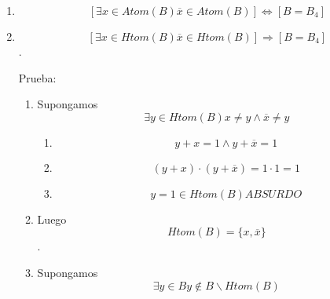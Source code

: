 \documentclass[
]{article}
\providecommand{\tightlist}{%
  \setlength{\itemsep}{0pt}\setlength{\parskip}{0pt}}
\begin{document}
\begin{enumerate}
\begin{enumerate}
\begin{enumerate}
\begin{enumerate}
        \[\land \left\lbrack {{{\left\lbrack {x\mathsf{\mathit{minimal}}y} \right\rbrack \land \left\lbrack {\overline{x}\mathsf{\mathit{minimal}}\overline{y}} \right\rbrack} \land \left\lbrack {\neg{({x\mathsf{\mathit{minimal}}\overline{y}})}} \right\rbrack} \land \left\lbrack {\neg{({\overline{x}\mathsf{\mathit{minimal}}y})}} \right\rbrack} \right\rbrack\]
      \item
        \[\forall{{\{{y,\overline{y}}\}} \subset B_{\ast}^{\ast}}{{{y \cdot \overline{x}} = {{0 \land y} + \overline{x}}} = 1}\]
      \item
        \[\forall{{\{{y,\overline{y}}\}} \subset B_{\ast}^{\ast}}{{y = {x \land \overline{y}}} = \overline{x}}\]
      \item
        \[{B_{\ast}^{\ast} = {{\{ 1,0\}} \cup \mathit{Atom}}}{{{(B)} = {\{{1,0,x,\overline{x}}\}}} = B_{4}}\]
      \end{enumerate}
    \item
      \[\left\lbrack {\exists{x \in \mathit{Atom}}{(B)}{\overline{x} \in \mathit{Atom}}{(B)}} \right\rbrack\Leftrightarrow\left\lbrack {B = B_{4}} \right\rbrack\]
    \item
      \[\left\lbrack {\exists{x \in \mathit{Htom}}{(B)}{\overline{x} \in \mathit{Htom}}{(B)}} \right\rbrack\Rightarrow\left\lbrack {B = B_{4}} \right\rbrack\].

      Prueba:

      \begin{enumerate}
      \def\labelenumiv{\arabic{enumiv}.}
      \item
        Supongamos
        \[\exists{y \in \mathit{Htom}}{(B)}{{x \neq {y \land \overline{x}}} \neq y}\]

        \begin{enumerate}
        \def\labelenumv{\arabic{enumv}.}
        \tightlist
        \item
          \[{{y + x} = {{1 \land y} + \overline{x}}} = 1\]
        \item
          \[{{{({y + x})} \cdot {({y + \overline{x}})}} = {1 \cdot 1}} = 1\]
        \item
          \[{{y = 1} \in \mathit{Htom}}{(B)}\mathit{ABSURDO}\]
        \end{enumerate}
      \item
        Luego \[\mathit{Htom}{{(B)} = {\{{x,\overline{x}}\}}}\].
      \item
        Supongamos
        \[\exists{y \in B}{y \notin {B \smallsetminus {\mathit{Htom}{(B)}}}}\]


\end{enumerate}
\end{enumerate}
\end{enumerate}
\end{enumerate}
\end{document}
